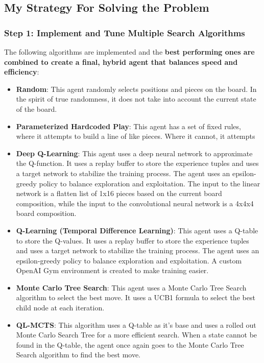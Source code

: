 \subsection{My Strategy For Solving the Problem}

\subsubsection{Step 1: Implement and Tune Multiple Search Algorithms}

The following algorithms are implemented and the \textbf{best performing ones are combined to create a final, hybrid agent that balances speed and efficiency}:

\begin{itemize}
    \item \textbf{Random}: This agent randomly selects positions and pieces on the board. In the spirit of true randomness, it does not take into account the current state of the board.
    \item \textbf{Parameterized Hardcoded Play}: This agent has a set of fixed rules, where it attempts to build a line of like pieces. Where it cannot, it attempts
    \item \textbf{Deep Q-Learning}: This agent uses a deep neural network to approximate the Q-function. It uses a replay buffer to store the experience tuples and uses a target network to stabilize the training process. The agent uses an epsilon-greedy policy to balance exploration and exploitation. The input to the linear network is a flatten list of 1x16 pieces based on the current board composition, while the input to the convolutional neural network is a 4x4x4 board composition.
    \item \textbf{Q-Learning (Temporal Difference Learning)}: This agent uses a Q-table to store the Q-values. It uses a replay buffer to store the experience tuples and uses a target network to stabilize the training process. The agent uses an epsilon-greedy policy to balance exploration and exploitation. A custom OpenAI Gym environment is created to make training easier.
    \item \textbf{Monte Carlo Tree Search}: This agent uses a Monte Carlo Tree Search algorithm to select the best move. It uses a UCB1 formula to select the best child node at each iteration.
    \item \textbf{QL-MCTS}: This algorithm uses a Q-table as it's base and uses a rolled out Monte Carlo Search Tree for a more efficient search. When a state cannot be found in the Q-table, the agent once again goes to the Monte Carlo Tree Search algorithm to find the best move.
\end{itemize}

